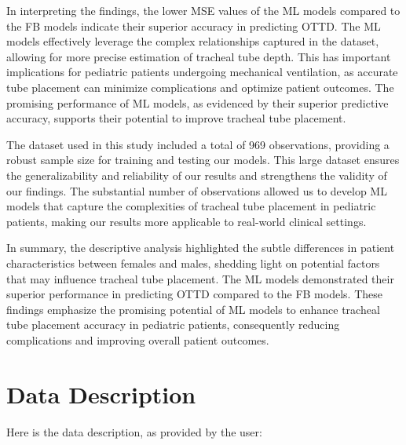 \documentclass[11pt]{article}
\begin{document}
In interpreting the findings, the lower MSE values of the ML models compared to the FB models indicate their superior accuracy in predicting OTTD. The ML models effectively leverage the complex relationships captured in the dataset, allowing for more precise estimation of tracheal tube depth. This has important implications for pediatric patients undergoing mechanical ventilation, as accurate tube placement can minimize complications and optimize patient outcomes. The promising performance of ML models, as evidenced by their superior predictive accuracy, supports their potential to improve tracheal tube placement.

The dataset used in this study included a total of 969 observations, providing a robust sample size for training and testing our models. This large dataset ensures the generalizability and reliability of our results and strengthens the validity of our findings. The substantial number of observations allowed us to develop ML models that capture the complexities of tracheal tube placement in pediatric patients, making our results more applicable to real-world clinical settings.

In summary, the descriptive analysis highlighted the subtle differences in patient characteristics between females and males, shedding light on potential factors that may influence tracheal tube placement. The ML models demonstrated their superior performance in predicting OTTD compared to the FB models. These findings emphasize the promising potential of ML models to enhance tracheal tube placement accuracy in pediatric patients, consequently reducing complications and improving overall patient outcomes.


\clearpage
\appendix

\section{Data Description} \label{sec:data_description} Here is the data description, as provided by the user:
\end{document}

